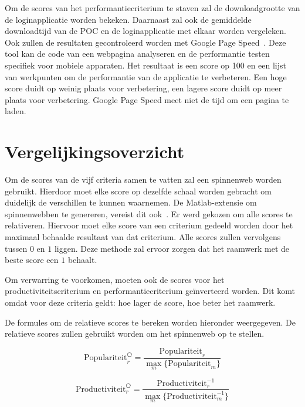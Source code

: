 Om de scores van het performantiecriterium te staven zal de downloadgrootte van de loginapplicatie worden bekeken.
Daarnaast zal ook de gemiddelde downloadtijd van de POC en de loginapplicatie met elkaar worden vergeleken.
Ook zullen de resultaten gecontroleerd worden met Google Page Speed~\cite{Morgan2011}. 
Deze tool kan de code van een webpagina analyseren en de performantie testen specifiek voor mobiele apparaten.
Het resultaat is een score op 100 en een lijst van werkpunten om de performantie van de applicatie te verbeteren.
Een hoge score duidt op weinig plaats voor verbetering,  een lagere score duidt op meer plaats voor verbetering.
Google Page Speed meet niet de tijd om een pagina te laden.


\section{Vergelijkingsoverzicht}
\label{sec:vergelijking-spinnenweb}

Om de scores van de vijf criteria samen te vatten zal een spinnenweb worden gebruikt.
Hierdoor moet elke score op dezelfde schaal worden gebracht om duidelijk de verschillen te kunnen waarnemen.
De Matlab-extensie om spinnenwebben te genereren, vereist dit ook~\cite{Martti2007}.
Er werd gekozen om alle scores te relativeren.
Hiervoor moet elke score van een criterium gedeeld worden door het maximaal behaalde resultaat van dat criterium.
Alle scores zullen vervolgens tussen $0$ en $1$ liggen.
Deze methode zal ervoor zorgen dat het raamwerk met de beste score een $1$ behaalt.

Om verwarring te voorkomen, moeten ook de scores voor het productiviteitscriterium en performantiecriterium geïnverteerd worden.
Dit komt omdat voor deze criteria geldt:  hoe lager de score,  hoe beter het raamwerk.

De formules om de relatieve scores te bereken worden hieronder weergegeven.
De relatieve scores zullen gebruikt worden om het spinnenweb op te stellen.

\begin{equation}
  \text{Populariteit}_r^{\pentagon}=\frac{\text{Populariteit}_r}{\underset{m}{\max}\{\text{Populariteit}_m\}}
  \label{eq:rel-populariteit}
\end{equation}

\begin{equation}
  \text{Productiviteit}_r^{\pentagon} = \frac{\text{Productiviteit}_r^{-1}}{\underset{m}{\max}\{\text{Productiviteit}_m^{-1}\}}
  \label{eq:rel-productiviteit}
\end{equation}

